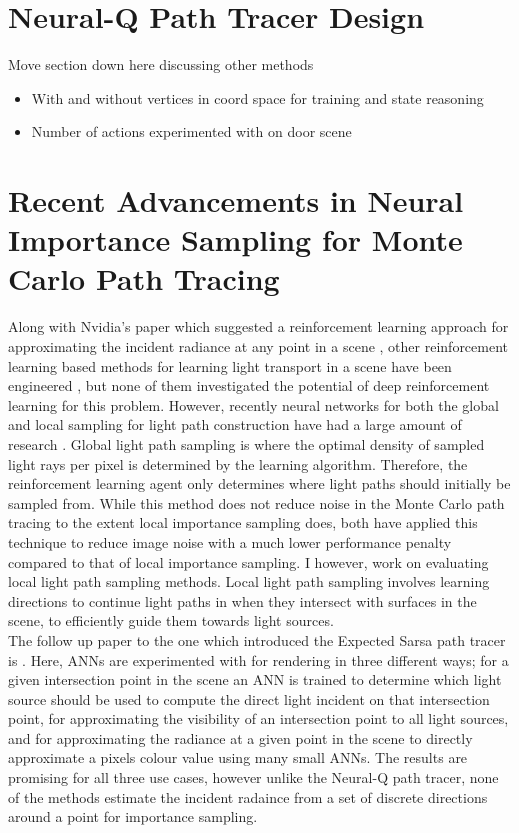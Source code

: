 \documentclass[../dissertation.tex]{subfiles}
\begin{document}
\section{Neural-Q Path Tracer Design}
Move section down here discussing other methods

\begin{itemize}
\item With and without vertices in coord space for training and state reasoning
\item Number of actions experimented with on door scene
\end{itemize}

\section{Recent Advancements in Neural Importance Sampling for Monte Carlo Path Tracing}

Along with Nvidia's paper which suggested a reinforcement learning approach for approximating the incident radiance at any point in a scene \cite{dahm2017learning}, other reinforcement learning based methods for learning light transport in a scene have been engineered \cite{muller2017practical, vorba2014line}, but none of them investigated the potential of deep reinforcement learning for this problem. However, recently neural networks for both the global and local sampling for light path construction have had a large amount of research \cite{zheng2018learning, muller2018neural, keller2019integral, hermosilla2018deep}. Global light path sampling is where the optimal density of sampled light rays per pixel is determined by the learning algorithm. Therefore, the reinforcement learning agent only determines where light paths should initially be sampled from. While this method does not reduce noise in the Monte Carlo path tracing to the extent local importance sampling does, both \cite{muller2017practical, zheng2018learning} have applied this technique to reduce image noise with a much lower performance penalty compared to that of local importance sampling. I however, work on evaluating local light path sampling methods. Local light path sampling involves learning directions to continue light paths in when they intersect with surfaces in the scene, to efficiently guide them towards light sources.\\

 The follow up paper to the one which introduced the Expected Sarsa path tracer \cite{dahm2017learning} is \cite{keller2019integral}. Here, ANNs are experimented with for rendering in three different ways; for a given intersection point in the scene an ANN is trained to determine which light source should be used to compute the direct light incident on that intersection point, for approximating the visibility of an intersection point to all light sources, and for approximating the radiance at a given point in the scene to directly approximate a pixels colour value using many small ANNs. The results are promising for all three use cases, however unlike the Neural-Q path tracer, none of the methods estimate the incident radaince from a set of discrete directions around a point for importance sampling.\\
 
\end{document}
